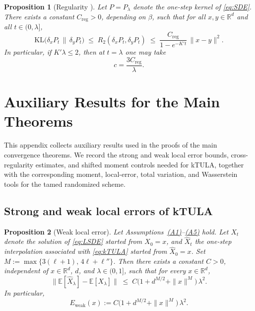 \documentclass[11pt,a4paper,reqno]{amsart}
\theoremstyle{plain}
\newtheorem{proposition}{Proposition}
\theoremstyle{definition}
\theoremstyle{remark}
\newcommand{\R}{\mathbb{R}}
\newcommand{\E}{\mathbb{E}}
\newcommand{\KL}{\mathrm{KL}}
\begin{document}
\begin{proposition}[Regularity {\citep[Theorem~1.1]{wang2011harnack}}]
\label{prop:regularity-app}
Let $P=P_\lambda$ denote the one-step kernel of \eqref{eq:SDE}. There exists a constant $C_{\mathrm{reg}}>0$, depending on $\beta$, such that for all $x,y\in\R^d$ and all $t \in (0,\lambda]$,
\[
  \KL\!\bigl(\delta_x P_t \,\big\|\, \delta_y P_t\bigr)
  \;\le\;  R_2(\delta_x P_t,\delta_y P_t) \;\le\;
  \frac{C_{\mathrm{reg}}}{1-e^{-K't}}\,\|x-y\|^2.
\]
In particular, if \(K'\lambda\le 2\), then at \(t=\lambda\) one may take
\[
  c=\frac{3C_{\mathrm{reg}}}{\lambda}.
\]
\end{proposition}



\newcommand{\TV}{\mathrm{TV}}


\section{Auxiliary Results for the Main Theorems}
\label{app:auxiliary-results}

This appendix collects auxiliary results used in the proofs of the main convergence theorems. We record the strong and weak local error bounds, cross-regularity estimates, and shifted moment controls needed for kTULA, together with the corresponding moment, local-error, total variation, and Wasserstein tools for the tamed randomized scheme.

\subsection{Strong and weak local errors of kTULA}

\begin{proposition}[Weak local error]
\label{prop:weak-error-app}
Let Assumptions~\hyperref[ass:PJG]{\textup{(A1)}}--\hyperref[ass:JLC]{\textup{(A5)}} hold.
Let \(X_t\) denote the solution of \eqref{eq:LSDE} started from \(X_0=x\), and
\(\widehat X_t\) the one-step interpolation associated with \eqref{eq:kTULA} started from \(\widehat X_0=x\).
Set \(M := \max\{3(\ell+1),\,4\ell+\ell''\}\).
Then there exists a constant \(C>0\), independent of \(x\in\R^d\), \(d\), and \(\lambda\in(0,1]\), such that for every \(x\in\R^d\),
\[
  \big\|\E[\widehat X_\lambda] - \E[X_\lambda]\big\|
  \;\le\;
  C\bigl(1+d^{M/2}+\|x\|^{M}\bigr)\,\lambda^{2}.
\]
In particular,
\[
  E_{\mathrm{weak}}(x)
  :=
  C\bigl(1+d^{M/2}+\|x\|^{M}\bigr)\,\lambda^{2}.
\]
\end{proposition}
\end{document}
